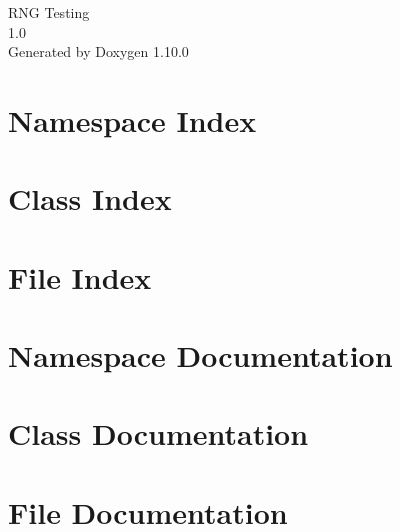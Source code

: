 \documentclass[twoside]{book}
\newcommand{\+}{\discretionary{\mbox{\scriptsize$\hookleftarrow$}}{}{}}
\newcommand{\clearemptydoublepage}{%
    \newpage{\pagestyle{empty}\cleardoublepage}%
  }
\begin{document}
  \raggedbottom
    \hypersetup{pageanchor=false,
                bookmarksnumbered=true,
                pdfencoding=unicode
               }
  \begin{titlepage}
  \vspace*{7cm}
  \begin{center}%
  {\Large RNG Testing}\\
  [1ex]\large 1.\+0 \\
  \vspace*{1cm}
  {\large Generated by Doxygen 1.10.0}\\
  \end{center}
  \end{titlepage}
  \clearemptydoublepage
  \tableofcontents
  \clearemptydoublepage
  \hypersetup{pageanchor=true}
\chapter{Namespace Index}

\chapter{Class Index}

\chapter{File Index}

\chapter{Namespace Documentation}



\chapter{Class Documentation}








\chapter{File Documentation}












  \backmatter
  \newpage
  \clearemptydoublepage
  \printindex
\end{document}

